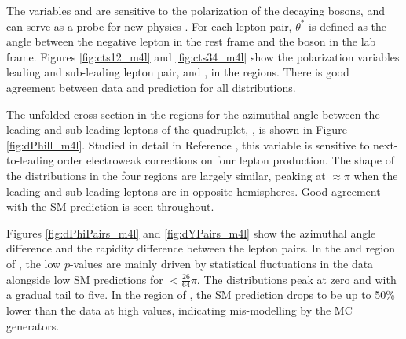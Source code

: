 The variables \CTSOneTwo{} and \CTSThreeFour{} are sensitive to the polarization of the decaying bosons, and can serve as a probe for new physics \cite{Denner_2020}. For each lepton pair, $\theta^*$ is defined as the angle between the negative lepton in the \Z rest frame and the \Z boson in the lab frame. Figures \ref{fig:cts12_m4l} and \ref{fig:cts34_m4l} show the polarization variables leading and sub-leading lepton pair, \CTSOneTwo{} and \CTSThreeFour{}, in the \mFourL{} regions. There is good agreement between data and prediction for all distributions. 

The unfolded cross-section in the \mFourL{} regions for the azimuthal angle between the leading and sub-leading leptons of the quadruplet, \dPhill{}, is shown in Figure \ref{fig:dPhill_m4l}. Studied in detail in Reference \cite{Gutschow_2021}, this variable is sensitive to next-to-leading order electroweak corrections on four lepton production. The shape of the distributions in the four regions are largely similar, peaking at \dPhill{}$\approx\pi$ when the leading and sub-leading leptons are in opposite hemispheres. Good agreement with the SM prediction is seen throughout.

Figures \ref{fig:dPhiPairs_m4l} and \ref{fig:dYPairs_m4l} show the azimuthal angle difference and the rapidity difference between the lepton pairs. In the \offshellZZ{} and \onshellZZ{} region of \dPhiPairs{}, the low $p$-values are mainly driven by statistical fluctuations in the data alongside low SM predictions for \dPhiPairs{}$<\frac{26}{64}\pi$. The \dYPairs{} distributions peak at zero and with a gradual tail to five. In the \onshellZZ{} region of \dYPairs{}, the SM prediction drops to be up to 50\% lower than the data at high values, indicating mis-modelling by the MC generators. 
